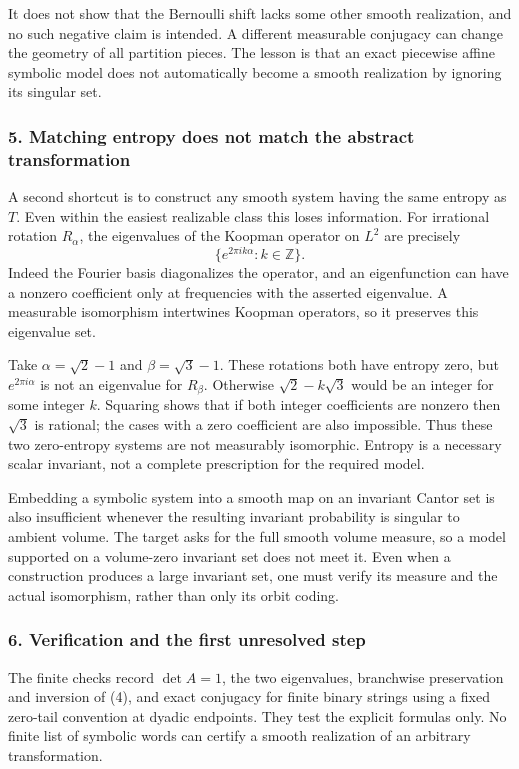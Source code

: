 \documentclass[11pt]{article}
\begin{document}
It does not show that the Bernoulli shift lacks some other smooth realization, and no such negative claim is intended. A different measurable conjugacy can change the geometry of all partition pieces. The lesson is that an exact piecewise affine symbolic model does not automatically become a smooth realization by ignoring its singular set.

\subsubsection{5. Matching entropy does not match the abstract transformation}
A second shortcut is to construct any smooth system having the same entropy as $T$. Even within the easiest realizable class this loses information. For irrational rotation $R_\alpha$, the eigenvalues of the Koopman operator on $L^2$ are precisely
\[
 \{e^{2\pi i k\alpha}:k\in\mathbb Z\}.
\]
Indeed the Fourier basis diagonalizes the operator, and an eigenfunction can have a nonzero coefficient only at frequencies with the asserted eigenvalue. A measurable isomorphism intertwines Koopman operators, so it preserves this eigenvalue set.

Take $\alpha=\sqrt2-1$ and $\beta=\sqrt3-1$. These rotations both have entropy zero, but $e^{2\pi i\alpha}$ is not an eigenvalue for $R_\beta$. Otherwise $\sqrt2-k\sqrt3$ would be an integer for some integer $k$. Squaring shows that if both integer coefficients are nonzero then $\sqrt3$ is rational; the cases with a zero coefficient are also impossible. Thus these two zero-entropy systems are not measurably isomorphic. Entropy is a necessary scalar invariant, not a complete prescription for the required model.

Embedding a symbolic system into a smooth map on an invariant Cantor set is also insufficient whenever the resulting invariant probability is singular to ambient volume. The target asks for the full smooth volume measure, so a model supported on a volume-zero invariant set does not meet it. Even when a construction produces a large invariant set, one must verify its measure and the actual isomorphism, rather than only its orbit coding.

\subsubsection{6. Verification and the first unresolved step}
The finite checks record $\det A=1$, the two eigenvalues, branchwise preservation and inversion of (4), and exact conjugacy for finite binary strings using a fixed zero-tail convention at dyadic endpoints. They test the explicit formulas only. No finite list of symbolic words can certify a smooth realization of an arbitrary transformation.
\end{document}
